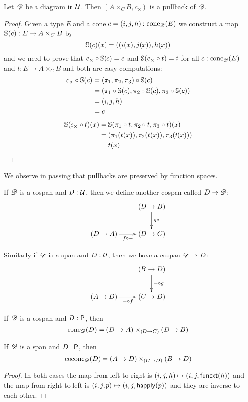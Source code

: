 \begin{lem}
  Let $\Ddiag$ be a diagram in $\type$. Then $(A\times_CB,c_\times)$ is a
  pullback of $\Ddiag$.
\end{lem}
\begin{proof}
  Given a type $E$ and a cone $c=(i,j,h):\cone{\Ddiag}{E}$ we construct a map
  $\Sn(c):E\to{}A\times_CB$ by
  \[\Sn(c)(x)=((i(x), j(x)), h(x))\]
  and we need to prove that $\composecone{\Sn(c)}{c_\times}=c$ and
  $\Sn(\composecone{t}{c_\times})=t$ for all $c:\cone{\Ddiag}{E}$ and
  $t:E\to{}A\times_CB$ and both are easy computations:
  \begin{align*}
    \composecone{\Sn(c)}{c_\times}
    &=\composecone{\Sn(c)}{(\pi_1,\pi_2,\pi_3)} \\
    &=(\pi_1\circ\Sn(c),\pi_2\circ\Sn(c),
    \pi_3\circ\Sn(c))\\
    &=(i,j,h)\\
    &=c
  \end{align*}
  \begin{align*}
    \Sn(\composecone{t}{c_\times})(x) &=
    \Sn(\pi_1\circ{}t,\pi_2\circ{}t,\pi_3\circ{}t)(x)\\
    &=(\pi_1(t(x)),\pi_2(t(x)),\pi_3(t(x)))\\
    &=t(x)\qedhere
  \end{align*}
\end{proof}

We observe in passing that pullbacks are preserved by function spaces.

\begin{defn}
  If $\Ddiag$ is a cospan and $D:\type$, then we define another
  cospan called $D\to\Ddiag$:
  \[\xymatrix{& (D\to B) \ar^{g\circ-}[d] \\ (D\to A) \ar_{f\circ-}[r] & (D\to
    C)}\]

  Similarly if $\Ddiag$ is a span and $D:\type$, then we have a
  cospan $\Ddiag\to{}D$:
  \[\xymatrix{& (B\to D) \ar^{-\circ{}g}[d] \\ (A\to D) \ar_{-\circ{}f}[r] &
    (C\to D)}\]
\end{defn}

\begin{lem}
  \label{coneispb}
  If $\Ddiag$ is a cospan and $D:\P$, then
  \[\cone{\Ddiag}{D}=(D\to{}A)\times_{(D\to{}C)}(D\to{}B)\]

  If $\Ddiag$ is a span and $D:\P$, then
  \[\cocone{\Ddiag}{D}=(A\to{}D)\times_{(C\to{}D)}(B\to{}D)\]
\end{lem}
\begin{proof}
  In both cases the map from left to right is $(i,j,h)\mapsto(i,j,\funext(h))$
  and the map from right to left is $(i,j,p)\mapsto(i,j,\happly(p))$ and they
  are inverse to each other.
\end{proof}

